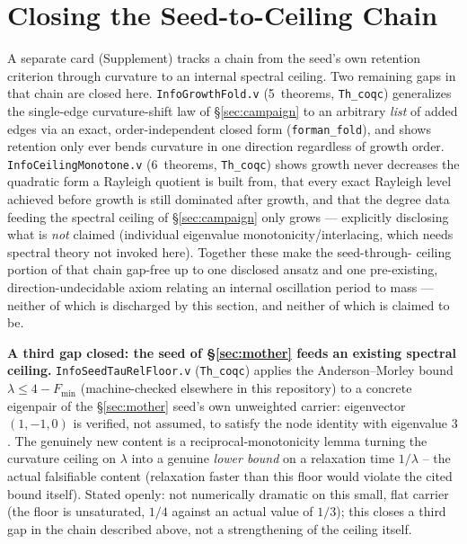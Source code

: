 \documentclass[10pt,twocolumn]{article}
\begin{document}
\section{Closing the Seed-to-Ceiling Chain}
\label{sec:seedchain}
A separate card (Supplement) tracks a chain from the seed's own retention
criterion through curvature to an internal spectral ceiling. Two remaining
gaps in that chain are closed here. \texttt{InfoGrowthFold.v}
(5~theorems, \texttt{Th\_coqc}) generalizes the single-edge curvature-shift
law of \S\ref{sec:campaign} to an arbitrary \emph{list} of added edges via an
exact, order-independent closed form (\texttt{forman\_fold}), and shows
retention only ever bends curvature in one direction regardless of growth
order. \texttt{InfoCeilingMonotone.v} (6~theorems, \texttt{Th\_coqc}) shows
growth never decreases the quadratic form a Rayleigh quotient is built from,
that every exact Rayleigh level achieved before growth is still dominated
after growth, and that the degree data feeding the spectral ceiling of
\S\ref{sec:campaign} only grows --- explicitly disclosing what is \emph{not}
claimed (individual eigenvalue monotonicity/interlacing, which needs
spectral theory not invoked here). Together these make the seed-through-
ceiling portion of that chain gap-free up to one disclosed ansatz and one
pre-existing, direction-undecidable axiom relating an internal oscillation
period to mass --- neither of which is discharged by this section, and
neither of which is claimed to be.

\textbf{A third gap closed: the seed of \S\ref{sec:mother} feeds an existing spectral
ceiling.} \texttt{InfoSeedTauRelFloor.v} (\texttt{Th\_coqc}) applies the Anderson--Morley
bound \cite{andersonmorley1985} $\lambda\le 4-F_{\min}$ (machine-checked elsewhere in this repository) to a concrete
eigenpair of the \S\ref{sec:mother} seed's own unweighted carrier: eigenvector $(1,-1,0)$ is
verified, not assumed, to satisfy the node identity with eigenvalue $3$. The genuinely new
content is a reciprocal-monotonicity lemma turning the curvature ceiling on $\lambda$ into a
genuine \emph{lower bound} on a relaxation time $1/\lambda$ -- the actual falsifiable content
(relaxation faster than this floor would violate the cited bound itself). Stated openly: not
numerically dramatic on this small, flat carrier (the floor is unsaturated, $1/4$ against an
actual value of $1/3$); this closes a third gap in the chain described above, not a
strengthening of the ceiling itself.
\end{document}
